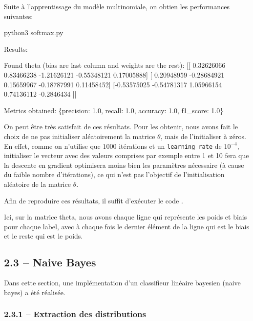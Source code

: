 \documentclass[
]{article}
\newenvironment{Shaded}{}{}
\newcommand{\NormalTok}[1]{#1}
\begin{document}
Suite à l'apprentissage du modèle multinomiale, on obtien les
performances suivantes:

\begin{Shaded}
\begin{Highlighting}[]
\NormalTok{python3 softmax.py}

\NormalTok{Results:}

\NormalTok{Found theta (bias are last column and weights are the rest):}
\NormalTok{[[ 0.32626066  0.83466238 {-}1.21626121 {-}0.55348121  0.17005888]}
\NormalTok{ [ 0.20948959 {-}0.28684921  0.15659967 {-}0.18787991  0.11458452]}
\NormalTok{ [{-}0.53575025 {-}0.54781317  1.05966154  0.74136112 {-}0.2846434 ]]}


\NormalTok{Metrics obtained:}
\NormalTok{\{\textquotesingle{}precision\textquotesingle{}: 1.0, \textquotesingle{}recall\textquotesingle{}: 1.0, \textquotesingle{}accuracy\textquotesingle{}: 1.0, \textquotesingle{}f1\_score\textquotesingle{}: 1.0\}}
\end{Highlighting}
\end{Shaded}

On peut être très satisfait de ces résultats. Pour les obtenir, nous
avons fait le choix de ne pas initialiser aléatoirement la matrice
\(\theta\), mais de l'initialiser à zéros. En effet, comme on n'utilise
que \(1000\) itérations et un \texttt{learning\_rate} de \(10^{-4}\),
initialiser le vecteur avec des valeurs comprises par exemple entre 1 et
10 fera que la descente en gradient optimisera moins bien les paramètres
nécessaire (à cause du faible nombre d'itérations), ce qui n'est pas
l'objectif de l'initialisation aléatoire de la matrice \(\theta\).

Afin de reproduire ces résultats, il suffit d'exécuter le code
.

Ici, sur la matrice theta, nous avons chaque ligne qui représente les
poids et biais pour chaque label, avec à chaque fois le dernier élément
de la ligne qui est le biais et le reste qui est le poids.

\newpage{}

\hypertarget{naive-bayes-1}{%
\subsection{2.3 -- Naive Bayes}\label{naive-bayes-1}}

Dans cette section, une implémentation d'un classifieur linéaire
bayesien (naive bayes) a été réalisée.

\hypertarget{extraction-des-distributions}{%
\subsubsection{2.3.1 -- Extraction des
distributions}\label{extraction-des-distributions}}
\end{document}
